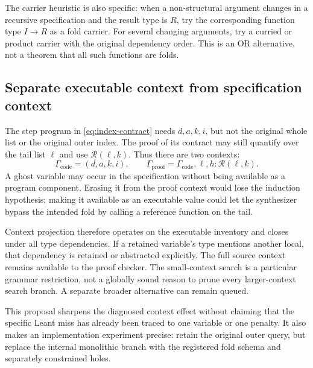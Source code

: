 The carrier heuristic is also specific: when a non-structural argument changes
in a recursive specification and the result type is $R$, try the corresponding
function type $I\to R$ as a fold carrier. For several changing arguments, try a
curried or product carrier with the original dependency order. This is an OR
alternative, not a theorem that all such functions are folds.

\subsection{Separate executable context from specification context}
The step program in \eqref{eq:index-contract} needs $d,a,k,i$, but not the
original whole list or the original outer index. The proof of its contract may
still quantify over the tail list $\ell$ and use
$\mathcal R(\ell,k)$. Thus there are two contexts:
\[
 \Gamma_{\mathrm{code}}=(d,a,k,i),
 \qquad
 \Gamma_{\mathrm{proof}}=\Gamma_{\mathrm{code}},\ell,
                         h:\mathcal R(\ell,k).
\]
A ghost variable may occur in the specification without being available as a
program component. Erasing it from the proof context would lose the induction
hypothesis; making it available as an executable value could let the synthesizer
bypass the intended fold by calling a reference function on the tail.

Context projection therefore operates on the executable inventory and closes
under all type dependencies. If a retained variable's type mentions another
local, that dependency is retained or abstracted explicitly. The full source
context remains available to the proof checker. The small-context search is a
particular grammar restriction, not a globally sound reason to prune every
larger-context search branch. A separate broader alternative can remain queued.

This proposal sharpens the diagnosed context effect without claiming that the
specific Leant miss has already been traced to one variable or one penalty.
It also makes an implementation experiment precise: retain the original outer
query, but replace the internal monolithic branch with the registered fold
schema and separately constrained holes.

